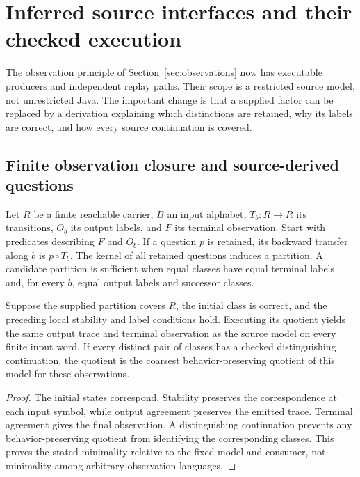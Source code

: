 \section{Inferred source interfaces and their checked execution}\label{sec:sourceinterfaces}

The observation principle of Section~\ref{sec:observations} now has executable producers and independent replay paths. Their scope is a restricted source model, not unrestricted Java. The important change is that a supplied factor can be replaced by a derivation explaining which distinctions are retained, why its labels are correct, and how every source continuation is covered.

\subsection{Finite observation closure and source-derived questions}
Let $R$ be a finite reachable carrier, $B$ an input alphabet, $T_b:R\to R$ its transitions, $O_b$ its output labels, and $F$ its terminal observation. Start with predicates describing $F$ and $O_b$. If a question $p$ is retained, its backward transfer along $b$ is $p\circ T_b$. The kernel of all retained questions induces a partition. A candidate partition is sufficient when equal classes have equal terminal labels and, for every $b$, equal output labels and successor classes.

\begin{proposition}\label{prop:observedfactor}
Suppose the supplied partition covers $R$, the initial class is correct, and the preceding local stability and label conditions hold. Executing its quotient yields the same output trace and terminal observation as the source model on every finite input word. If every distinct pair of classes has a checked distinguishing continuation, the quotient is the coarsest behavior-preserving quotient of this model for these observations.
\end{proposition}
\begin{proof}
The initial states correspond. Stability preserves the correspondence at each input symbol, while output agreement preserves the emitted trace. Terminal agreement gives the final observation. A distinguishing continuation prevents any behavior-preserving quotient from identifying the corresponding classes. This proves the stated minimality relative to the fixed model and consumer, not minimality among arbitrary observation languages.
\end{proof}

